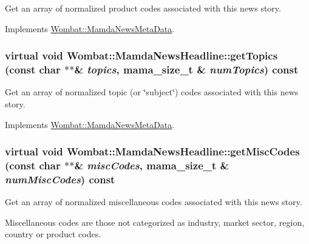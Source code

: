 Get an array of normalized product codes associated with this news story. 



Implements \hyperlink{classWombat_1_1MamdaNewsMetaData_1b7d9ba9d0e807d16ada32145c937e73}{Wombat::Mamda\-News\-Meta\-Data}.\hypertarget{classWombat_1_1MamdaNewsHeadline_32409e948ff75b589569022baa988cbf}{
\subsubsection[getTopics]{\setlength{\rightskip}{0pt plus 5cm}virtual void Wombat::Mamda\-News\-Headline::get\-Topics (const char $\ast$$\ast$\& {\em topics}, mama\_\-size\_\-t \& {\em num\-Topics}) const}}
\label{classWombat_1_1MamdaNewsHeadline_32409e948ff75b589569022baa988cbf}


Get an array of normalized topic (or \char`\"{}subject\char`\"{}) codes associated with this news story. 



Implements \hyperlink{classWombat_1_1MamdaNewsMetaData_2f4ff23afa293710b658b94ecb0ab63d}{Wombat::Mamda\-News\-Meta\-Data}.\hypertarget{classWombat_1_1MamdaNewsHeadline_e072447d35b0890cd27e694f02859705}{
\subsubsection[getMiscCodes]{\setlength{\rightskip}{0pt plus 5cm}virtual void Wombat::Mamda\-News\-Headline::get\-Misc\-Codes (const char $\ast$$\ast$\& {\em misc\-Codes}, mama\_\-size\_\-t \& {\em num\-Misc\-Codes}) const}}
\label{classWombat_1_1MamdaNewsHeadline_e072447d35b0890cd27e694f02859705}


Get an array of normalized miscellaneous codes associated with this news story. 

Miscellaneous codes are those not categorized as industry, market sector, region, country or product codes. 

